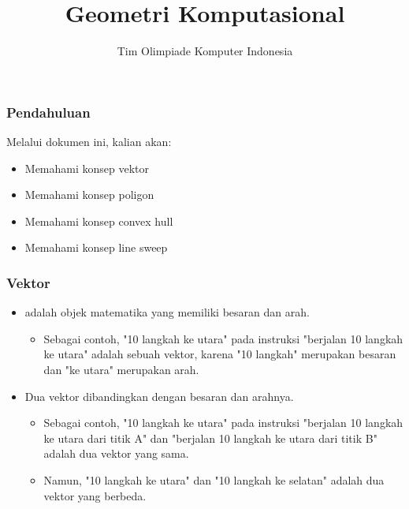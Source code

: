 

\title{Geometri Komputasional}
\author{Tim Olimpiade Komputer Indonesia}
\date{}



\begin{frame}
\titlepage
\end{frame}

\begin{frame}
\frametitle{Pendahuluan}
Melalui dokumen ini, kalian akan:
\begin{itemize}
  \item Memahami konsep vektor
  \item Memahami konsep poligon
  \item Memahami konsep convex hull
  \item Memahami konsep line sweep
\end{itemize}
\end{frame}

\begin{frame}
\frametitle{Vektor}
\begin{itemize}
  \item {} adalah objek matematika yang memiliki besaran dan arah.
  \begin{itemize}
    \item Sebagai contoh, "10 langkah ke utara" pada instruksi "berjalan 10 langkah ke utara" adalah sebuah vektor, karena "10 langkah" merupakan besaran dan "ke utara" merupakan arah. 
  \end{itemize}
  \item Dua vektor dibandingkan dengan besaran dan arahnya.
  \begin{itemize}
    \item Sebagai contoh, "10 langkah ke utara" pada instruksi "berjalan 10 langkah ke utara dari titik A" dan "berjalan 10 langkah ke utara dari titik B" adalah dua vektor yang sama.
    \item Namun, "10 langkah ke utara" dan "10 langkah ke selatan" adalah dua vektor yang berbeda.
  \end{itemize}
\end{itemize}
\end{frame}

